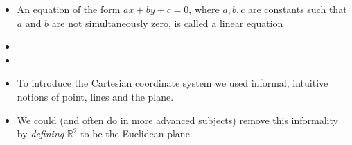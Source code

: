 \begin{frame}
\begin{definition}
\begin{itemize}
\item An equation of the form $ax+by+c=0$, where $a,b,c$ are constants such that $a$ and $b$ are not simultaneously zero, is called a linear equation
\item<2->
\item<3->  
\end{itemize}
\end{definition}

\begin{itemize}
\item<4-> To introduce the Cartesian coordinate system we used informal, intuitive notions of point, lines and the plane.
\item<5-> We could (and often do in more advanced subjects) remove this informality by \emph{defining} $\mathbb R^2$ to be the Euclidean plane.
\end{itemize}
\end{frame}